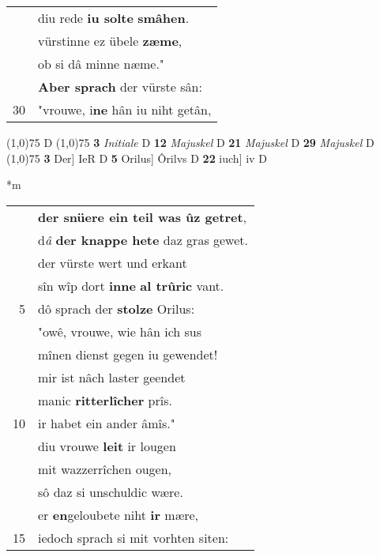 \documentclass[8pt,a4paper,notitlepage]{article}
\begin{document}
\begin{table}[ht]
\begin{minipage}[t]{0.5\linewidth}
\begin{tabular}{rl}
 & diu rede \textbf{iu solte} \textbf{smâhen}.\\ 
 & vürstinne ez übele \textbf{zæme},\\ 
 & ob si dâ minne næme."\\ 
 & \textbf{Aber sprach} der vürste sân:\\ 
30 & "vrouwe, i\textbf{ne} hân iu niht getân,\\ 
\end{tabular}
\scriptsize
\line(1,0){75} \newline
D \newline
\line(1,0){75} \newline
\textbf{3} \textit{Initiale} D  \textbf{12} \textit{Majuskel} D  \textbf{21} \textit{Majuskel} D  \textbf{29} \textit{Majuskel} D  \newline
\line(1,0){75} \newline
\textbf{3} Der] IeR D \textbf{5} Orilus] Ôrilvs D \textbf{22} iuch] iv D \newline
\end{minipage}
\hspace{0.5cm}
\begin{minipage}[t]{0.5\linewidth}
\small
\begin{center}*m
\end{center}
\begin{tabular}{rl}
 & \textbf{der snüere ein teil was ûz getret},\\ 
 & d\textit{â} \textbf{der knappe hete} daz gras gewet.\\ 
 & der vürste wert und erkant\\ 
 & sîn wîp dort \textbf{inne} \textbf{al trûric} vant.\\ 
5 & dô sprach der \textbf{stolze} Orilus:\\ 
 & "owê, vrouwe, wie hân ich sus\\ 
 & mînen dienst gegen iu gewendet!\\ 
 & mir ist nâch laster geendet\\ 
 & manic \textbf{ritterlîcher} prîs.\\ 
10 & ir habet ein ander âmîs."\\ 
 & diu vrouwe \textbf{leit} ir lougen\\ 
 & mit wazzerrîchen ougen,\\ 
 & sô daz si unschuldic wære.\\ 
 & er \textbf{en}geloubete niht \textbf{ir} mære,\\ 
15 & iedoch sprach si mit vorhten siten:\\ 

\end{tabular}
\end{minipage}
\end{table}
\end{document}
